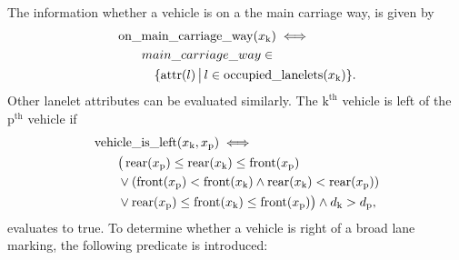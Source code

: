 The information whether a vehicle is on a the main carriage way, is given by
\begin{align*}
& \operatorname*{on\_main\_carriage\_way}(x_\text{k}) \iff \\
& \qquad main\_carriage\_way \in\\ 
& \qquad \quad \{\operatorname*{attr}(l)  \, \big| \, l \in \operatorname*{occupied\_lanelets}(x_\text{k})\}.
\end{align*}
Other lanelet attributes can be evaluated similarly.
The $\text{k}^\mathrm{th}$ vehicle is left of the $\text{p}^\mathrm{th}$ vehicle if
\begin{align*}
\begin{split}
& \operatorname*{vehicle\_is\_left}(x_\text{k}, x_\text{p}) \iff \\
&\qquad \big(\operatorname*{rear}(x_\text{p}) \leq  \operatorname*{rear}(x_\text{k}) \leq  \operatorname*{front}(x_\text{p}) \\
& \qquad \lor (\operatorname*{front}(x_\text{p}) < \operatorname*{front}(x_\text{k}) \land   \operatorname*{rear}(x_\text{k}) < \operatorname*{rear}(x_\text{p})) \\
& \qquad \lor \operatorname*{rear}(x_\text{p}) \leq  \operatorname*{front}(x_\text{k}) \leq  \operatorname*{front}(x_\text{p}) \big) \land d_\mathrm{k} > d_\mathrm{p}, \\
\end{split}
\end{align*} 
evaluates to true. To determine whether a vehicle is right of a broad lane marking, the following predicate is introduced:
